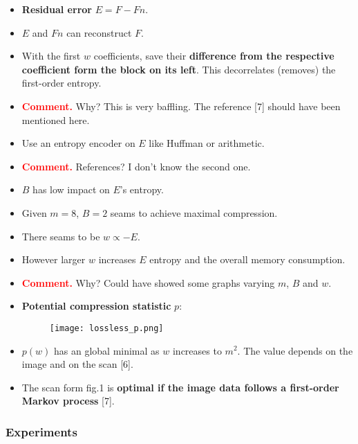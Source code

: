 \documentclass[10pt, twoside, twocolumn]{paper} %
\begin{document}
\begin{itemize}[noitemsep]
  \item \textbf{Residual error} $E=F-Fn$.
  \item $E$ and $Fn$ can reconstruct $F$.
  \item With the first $w$ coefficients, save their \textbf{difference from the respective coefficient form the block on its left}. This decorrelates (removes) the first-order entropy.
  \item\textcolor{red}{\textbf{Comment.}} Why? This is very baffling. The reference [7] should have been mentioned here.
  \item Use an entropy encoder on $E$ like Huffman or arithmetic.
  \item\textcolor{red}{\textbf{Comment.}} References? I don't know the second one.
  \item $B$ has low impact on $E$'s entropy.
  \item Given $m=8$, $B=2$ seams to achieve maximal compression.
  \item There seams to be $w\propto-E$.
  \item However larger $w$ increases $E$ entropy and the overall memory consumption.
  \item\textcolor{red}{\textbf{Comment.}} Why? Could have showed some graphs varying $m$, $B$ and $w$.
  \item \textbf{Potential compression statistic} $p$:
  \begin{figure}[H]
    \centering
    \texttt{[image: lossless\_p.png]}
  \end{figure}
  \item $p(w)$ has an global minimal as $w$ increases to $m^2$. The value depends on the image and on the scan [6].
  \item The scan form fig.1 is \textbf{optimal if the image data follows a first-order Markov process} [7].
\end{itemize}

\subsubsection*{Experiments}
\end{document}
